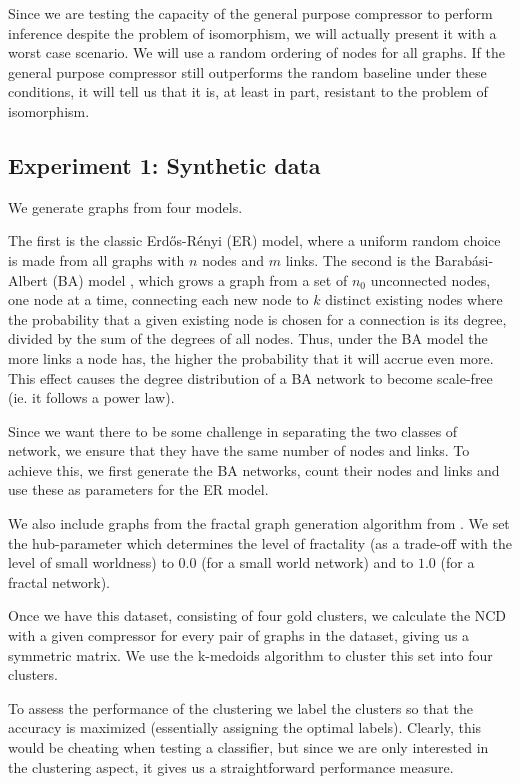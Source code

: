 \documentclass{article}
\begin{document}
Since we are testing the capacity of the general purpose compressor to perform inference despite the problem of isomorphism, we will actually present it with a worst case scenario. We will use a random ordering of nodes for all graphs. If the general purpose compressor still outperforms the random baseline under these conditions, it will tell us that it is, at least in part, resistant to the problem of isomorphism.

\subsection*{Experiment 1: Synthetic data}

We generate graphs from four models. 

The first is the classic Erd\H{o}s-R\'enyi (ER) model, where a uniform random choice is made from all graphs with $n$ nodes and $m$ links. The second is the Barab\'asi-Albert (BA) model \cite{albert2002statistical}, which grows a graph from a set of $n_0$ unconnected nodes, one node at a time, connecting each new node to $k$ distinct existing nodes where the probability that a given existing node is chosen for a connection is its degree, divided by the sum of the degrees of all nodes. Thus, under the BA model the more links a node has, the higher the probability that it will accrue even more. This effect causes the degree distribution of a BA network to become scale-free (ie. it follows a power law).

Since we want there to be some challenge in separating the two classes of network, we ensure that they have the same number of nodes and links. To achieve this, we first generate the BA networks, count their nodes and links and use these as parameters for the ER model.
 
We also include graphs from the fractal graph generation algorithm from \cite{song2006origins}. We set the hub-parameter which determines the level of fractality (as a trade-off with the level of small worldness) to $0.0$ (for a small world network) and to $1.0$ (for a fractal network).

Once we have this dataset, consisting of four gold clusters, we calculate the NCD with a given compressor for every pair of graphs in the dataset, giving us a symmetric matrix. We use the k-medoids algorithm to cluster this set into four clusters. 

To assess the performance of the clustering we label the clusters so that the accuracy is maximized (essentially assigning the optimal labels). Clearly, this would be cheating when testing a classifier, but since we are only interested in the clustering aspect, it gives us a straightforward performance measure.
\end{document}
